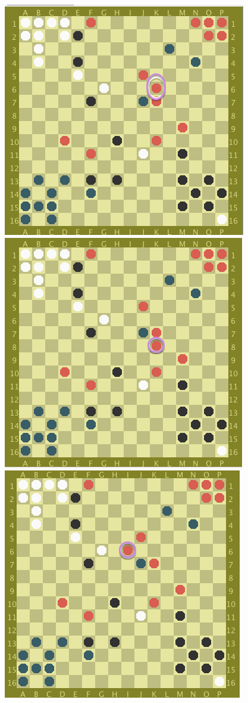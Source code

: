 \documentclass[paper=a4, fontsize=11pt]{scrartcl}
\numberwithin{equation}{section}		%
\numberwithin{figure}{section}			%
\numberwithin{table}{section}				%
\begin{document}
\begin{figure}[h!]
\includegraphics[scale=.2]{1}
\includegraphics[scale=.2]{2}
\includegraphics[scale=.2]{3}

\end{figure}
\end{document}
